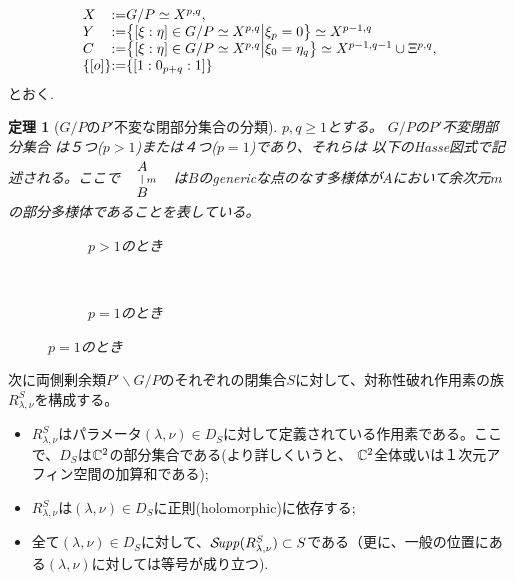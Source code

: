 \documentclass[12pt]{article} %
\newcommand{\Supp}{\mathcal{S}\!{\it upp}}
\newtheorem{theorem}{定理}
\theoremstyle{definition}
\theoremstyle{exampstyle} \newtheorem{examp}[theorem]{Theorem}
\begin{document}
\[\begin{array}{@{}l@{}l@{}l@{}}
X&:=&G/P\simeq X^{p,q},\\
Y&:=&\mysetn{[\xi:\eta]\in G/P\simeq X^{p,q}}{\xi_{p}=0}\simeq X^{p-1,q}\\
C&:=&\mysetn{[\xi:\eta]\in G/P\simeq X^{p,q}}{\xi_{0}=\eta_q}\simeq X^{p-1,q-1}\cup\Xi^{p,q},\\
\left\{ [o] \right\}&:=&\left\{ [1:0_{p+q}:1] \right\}
\end{array}\]
{とおく.}
\begin{theorem}[$G/P$の$P'$不変な閉部分集合の分類]
	$p,q\ge1$とする。
	$G/P$の$P'$不変閉部分集合
は５つ($p>1$){または}４つ($p=1$)であり、それらは
以下のHasse図式で記述される。ここで
	$
	\begin{array}{l}
	        \xymatrixrowsep{0.5pc}
		\xymatrix{A\ar@{-}[d]^m\\B}
	\end{array}
	$
	は$B$のgenericな点のなす多様体が$A$において余次元$m$の部分多様体であることを表している。\\
  \begin{figure}[H]
    \centering
    \begin{subfigure}[t]{0.3\textwidth}
	    \xymatrixrowsep{0.5pc}
	\caption{$p>1$のとき}
    \end{subfigure}
    ~ %
    \begin{subfigure}[t]{0.3\textwidth}
	    \xymatrixrowsep{0.5pc}
	    {}
	\caption{$p=1$のとき}
    \end{subfigure}
\end{figure}
\end{theorem}
次に両側剰余類$P'\backslash G/P$のそれぞれの閉集合$S$に対して、対称性破れ作用素の族$R^S_{\lambda,\nu}$を構成する。
\begin{itemize}
	\item $R_{\lambda,\nu}^S$はパラメータ$(\lambda,\nu)\in D_S$に対して定義されている作用素である。ここで、$D_S$は$\mathbb{C}^2$の部分集合である(より詳しくいうと、
		$\mathbb{C}^2$全体或いは１次元アフィン空間の加算和である);
	\item $R_{\lambda,\nu}^S$は$(\lambda,\nu)\in D_S$に正則(holomorphic)に依存する;
	\item 全て$(\lambda,\nu)\in D_S$に対して、$\Supp(R_{\lambda,\nu}^S)\subset S$である（更に、一般の位置に{ある}$(\lambda,\nu)$に対しては{等号}が成り立つ).
\end{itemize}
\end{document}
